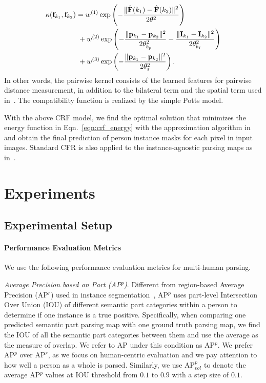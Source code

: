 \documentclass[10pt, letterpaper]{article}
\begin{document}
\begin{equation}\label{eqn:crf_pairwise_term}
\begin{split}
\kappa(\mathbf{f}_{k_1}, \mathbf{f}_{k_2})  
& = w^{(1)} \exp\left(- \frac{\|\hat{\mathbf{F}}(k_1) -\hat{\mathbf{F}}(k_2)\|^2}{2\theta^2}\right) \\
&\hspace{1mm}+ w^{(2)} \exp\left(-\frac{\|\mathbf{p}_{k_1}-\mathbf{p}_{k_2}\|^2}{2\theta_{b_p}^2}-\frac{\|\mathbf{I}_{k_1}-\mathbf{I}_{k_2}\|^2}{2\theta_{b_I}^2}\right) \\
&\hspace{1mm}+ w^{(3)} \exp\left(-\frac{\|\mathbf{p}_{k_1}-\mathbf{p}_{k_2}\|^2}{2\theta_s^2}\right).
\end{split}
\end{equation}
In other words, the pairwise kernel consists of the learned features for pairwise distance measurement, in addition to the bilateral term and the spatial term used in~\cite{krahenbuhl2011efficient}. The compatibility function is realized by the simple Potts model.

With the above CRF model, we find the optimal solution that minimizes the energy function in Eqn.~\eqref{eqn:crf_energy} with the approximation algorithm in~\cite{krahenbuhl2011efficient} and obtain the final prediction of person instance masks for each pixel in input images. Standard CFR is also applied to the instance-agnostic parsing maps as in~\cite{chen2016deeplab}. 

\section{Experiments}
\subsection{Experimental Setup}
\paragraph{Performance Evaluation Metrics}
We use the following performance evaluation metrics for multi-human parsing. 

\emph{Average Precision based on Part (AP$^p$)}. Different from region-based Average Precision (AP$^r$) used in instance segmentation~\cite{liang2015proposal,hariharan2014simultaneous},  AP$^p$ uses part-level Intersection Over Union (IOU) of different semantic part categories within a person to determine if one instance is a true positive. Specifically, when comparing one predicted semantic part parsing map with one ground truth parsing map, we find the IOU of all the semantic part categories between them and use the average as the measure of overlap. We refer to AP under this condition as AP$^p$.  We prefer AP$^p$ over AP$^r$, as we focus on human-centric evaluation and we pay attention to how well a person as a whole is parsed. Similarly, we use AP$^p_{vol}$ to denote the average AP$^p$ values at IOU threshold from $0.1$ to $0.9$ with a step size of $0.1$. 
\end{document}
